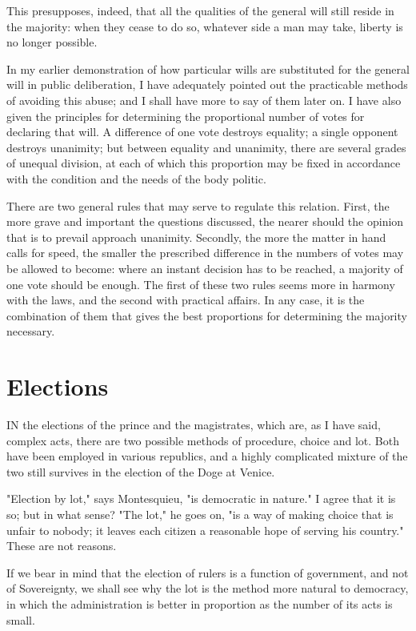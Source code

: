 \documentclass[12pt]{book}
\begin{document}
This presupposes, indeed, that all the qualities of the general will still reside in the majority: when they cease to do so, whatever side a man may take, liberty is no longer possible.

In my earlier demonstration of how particular wills are substituted for the general will in public deliberation, I have adequately pointed out the practicable methods of avoiding this abuse; and I shall have more to say of them later on. I have also given the principles for determining the proportional number of votes for declaring that will. A difference of one vote destroys equality; a single opponent destroys unanimity; but between equality and unanimity, there are several grades of unequal division, at each of which this proportion may be fixed in accordance with the condition and the needs of the body politic.

There are two general rules that may serve to regulate this relation. First, the more grave and important the questions discussed, the nearer should the opinion that is to prevail approach unanimity. Secondly, the more the matter in hand calls for speed, the smaller the prescribed difference in the numbers of votes may be allowed to become: where an instant decision has to be reached, a majority of one vote should be enough. The first of these two rules seems more in harmony with the laws, and the second with practical affairs. In any case, it is the combination of them that gives the best proportions for determining the majority necessary.

\section{Elections}
IN the elections of the prince and the magistrates, which are, as I have said, complex acts, there are two possible methods of procedure, choice and lot. Both have been employed in various republics, and a highly complicated mixture of the two still survives in the election of the Doge at Venice.

"Election by lot," says Montesquieu, "is democratic in nature." I agree that it is so; but in what sense? "The lot," he goes on, "is a way of making choice that is unfair to nobody; it leaves each citizen a reasonable hope of serving his country." These are not reasons.

If we bear in mind that the election of rulers is a function of government, and not of Sovereignty, we shall see why the lot is the method more natural to democracy, in which the administration is better in proportion as the number of its acts is small.
\end{document}
